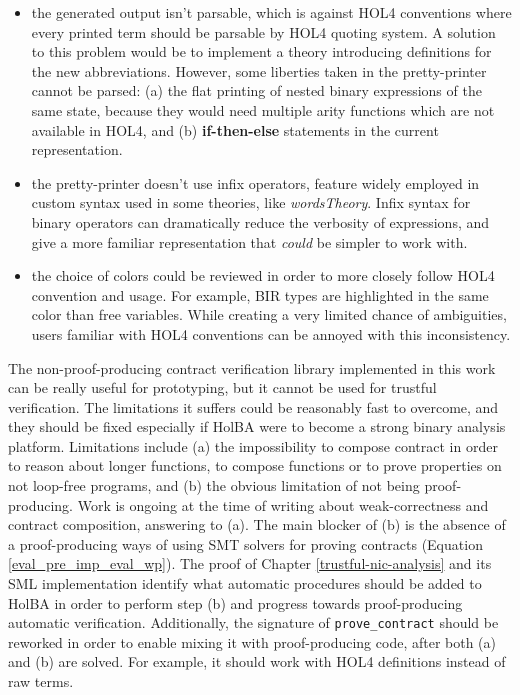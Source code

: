 \documentclass{kththesis}
\begin{document}
{\begin{itemize}
    \item the generated output isn't parsable, which is against HOL4 conventions where every printed term should be parsable by HOL4 quoting system. A solution to this problem would be to implement a theory introducing definitions for the new abbreviations. However, some liberties taken in the pretty-printer cannot be parsed: (a) the flat printing of nested binary expressions of the same state, because they would need multiple arity functions which are not available in HOL4, and (b) \textbf{if-then-else} statements in the current representation.
    \item the pretty-printer doesn't use infix operators, feature widely employed in custom syntax used in some theories, like \textit{wordsTheory}. Infix syntax for binary operators can dramatically reduce the verbosity of expressions, and give a more familiar representation that \textit{could} be simpler to work with.
    \item the choice of colors could be reviewed in order to more closely follow HOL4 convention and usage. For example, BIR types are highlighted in the same color than free variables. While creating a very limited chance of ambiguities, users familiar with HOL4 conventions can be annoyed with this inconsistency.
\end{itemize}

The non-proof-producing contract verification library implemented in this work can be really useful for prototyping, but it cannot be used for trustful verification. The limitations it suffers could be reasonably fast to overcome, and they should be fixed especially if HolBA were to become a strong binary analysis platform. Limitations include (a) the impossibility to compose contract in order to reason about longer functions, to compose functions or to prove properties on not loop-free programs, and (b) the obvious limitation of not being proof-producing. Work is ongoing at the time of writing about weak-correctness and contract composition, answering to (a). The main blocker of (b) is the absence of a proof-producing ways of using SMT solvers for proving contracts (Equation \ref{eval_pre_imp_eval_wp}). The proof of Chapter \ref{trustful-nic-analysis} and its SML implementation identify what automatic procedures should be added to HolBA in order to perform step (b) and progress towards proof-producing automatic verification. Additionally, the signature of \texttt{prove\_contract} should be reworked in order to enable mixing it with proof-producing code, after both (a) and (b) are solved. For example, it should work with HOL4 definitions instead of raw terms.

}
\end{document}
